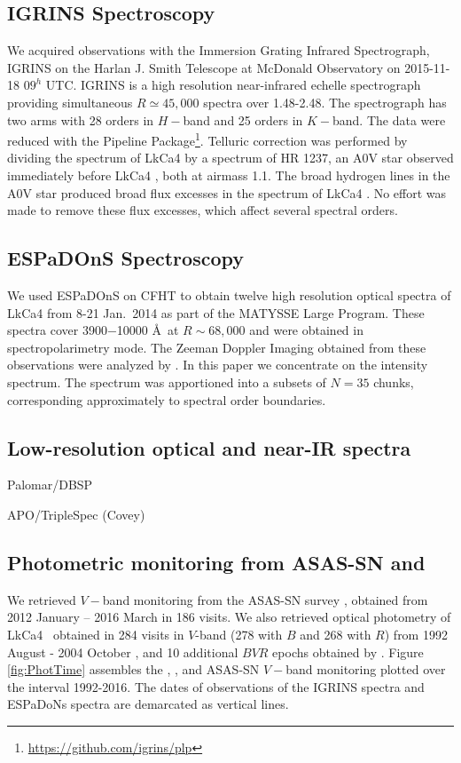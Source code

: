 \documentclass[twocolumn]{emulateapj}%
\newcommand{\name}{LkCa4 }
\begin{document}
\subsection{IGRINS Spectroscopy}\label{sec:igrins} 
We acquired observations with the Immersion Grating Infrared Spectrograph, IGRINS \citep{gully12,park14} on the Harlan J. Smith Telescope at McDonald Observatory on 2015-11-18 $09^h$ UTC.  IGRINS is a high resolution near-infrared echelle spectrograph providing simultaneous $R\simeq45,000$ spectra over 1.48-2.48\um.  The spectrograph has two arms with 28 orders in $H-$band and 25 orders in $K-$band.  The data were reduced with the Pipeline Package\footnote{\url{https://github.com/igrins/plp}}.  Telluric correction was performed by dividing the spectrum of \name by a spectrum of HR 1237, an A0V star observed immediately before \name, both at airmass 1.1.  The broad hydrogen lines in the A0V star produced broad flux excesses in the spectrum of \name.  No effort was made to remove these flux excesses, which affect several spectral orders. 


\subsection{ESPaDOnS Spectroscopy}
We used ESPaDOnS on CFHT to obtain twelve high resolution optical spectra of \name from 8-21 Jan.~2014 as part of the MATYSSE Large Program.  These spectra cover 3900$-$10000 \AA\ at $R\sim68,000$ and were obtained in spectropolarimetry mode.  The Zeeman Doppler Imaging obtained from these observations were analyzed by \citet{donati14}.  In this paper we concentrate on the intensity spectrum.  The spectrum was apportioned into a subsets of $N=35$ chunks, corresponding approximately to spectral order boundaries.


\subsection{Low-resolution optical and near-IR spectra}

Palomar/DBSP \citep{herczeg14}

APO/TripleSpec (Covey)


\subsection{Photometric monitoring from ASAS-SN and \citet{grankin08}}

We retrieved $V-$band monitoring from the ASAS-SN survey \citep{shappee14}, obtained from 2012 January -- 2016 March in 186 visits.
We also retrieved optical photometry of \name\ obtained in 284 visits in $V$-band (278 with $B$ and 268 with $R$) from 1992 August - 2004 October \citep{grankin08}, and 10 additional $BVR$ epochs obtained by \citet{donati14}.   Figure \ref{fig:PhotTime} assembles the \citet{grankin08}, \citet{donati14}, and ASAS-SN $V-$band monitoring plotted over the interval 1992-2016.  The dates of observations of the IGRINS spectra and ESPaDoNs spectra are demarcated as vertical lines.
\end{document}
